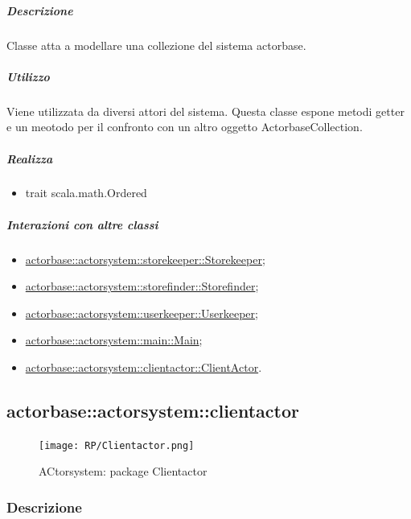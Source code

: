 \documentclass{scalatekids-article}
\begin{document}
\subparagraph{Descrizione}
Classe atta a modellare una collezione del sistema actorbase.

\subparagraph{Utilizzo}
Viene utilizzata da diversi attori del sistema. Questa classe espone metodi
getter e un meotodo per il confronto con un altro oggetto ActorbaseCollection.

\subparagraph{Realizza}
\begin{itemize}
\item trait scala.math.Ordered
\end{itemize}

\subparagraph{Interazioni con altre classi}

\begin{itemize}
\item \hyperref[sec:actorbase::actorsystem::storekeeper::Storekeeper]{actorbase::actorsystem::storekeeper::Storekeeper};
\item \hyperref[sec:actorbase::actorsystem::storefinder::Storefinder]{actorbase::actorsystem::storefinder::Storefinder};
\item \hyperref[sec:actorbase::actorsystem::userkeeper::Userkeeper]{actorbase::actorsystem::userkeeper::Userkeeper};
\item \hyperref[sec:actorbase::actorsystem::main::Main]{actorbase::actorsystem::main::Main};
\item \hyperref[sec:actorbase::actorsystem::clientactor::ClientActor]{actorbase::actorsystem::clientactor::ClientActor}.
\end{itemize}


\subsection{actorbase::actorsystem::clientactor}
\label{sec:actorbase::actorsystem::clientactor}

\begin{figure}[H]
  \begin{center}
    \texttt{[image: RP/Clientactor.png]}
    \caption{ACtorsystem: package Clientactor}
  \end{center}
\end{figure}

\subsubsection{Descrizione}
\end{document}
